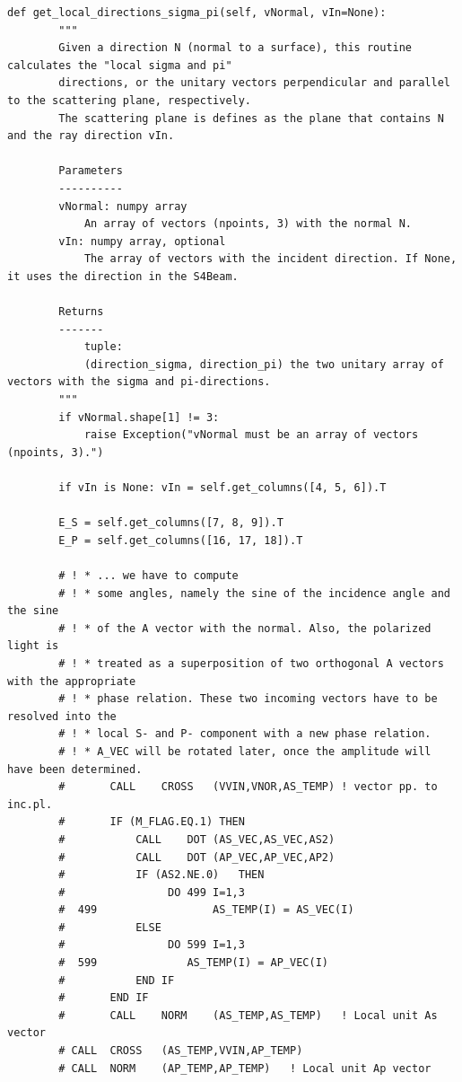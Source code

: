 \documentclass{iucr}
\begin{document}
\begin{lstlisting}[caption={Method of {\tt S4Beam} to compute the local directions $\sigma$ and $\pi$ at the beamline element.}, label={lst:localsigmaandpi}, captionpos=b]
    def get_local_directions_sigma_pi(self, vNormal, vIn=None):
        """
        Given a direction N (normal to a surface), this routine calculates the "local sigma and pi"
        directions, or the unitary vectors perpendicular and parallel to the scattering plane, respectively.
        The scattering plane is defines as the plane that contains N and the ray direction vIn.

        Parameters
        ----------
        vNormal: numpy array
            An array of vectors (npoints, 3) with the normal N.
        vIn: numpy array, optional
            The array of vectors with the incident direction. If None, it uses the direction in the S4Beam.

        Returns
        -------
            tuple:
            (direction_sigma, direction_pi) the two unitary array of vectors with the sigma and pi-directions.
        """
        if vNormal.shape[1] != 3:
            raise Exception("vNormal must be an array of vectors (npoints, 3).")

        if vIn is None: vIn = self.get_columns([4, 5, 6]).T

        E_S = self.get_columns([7, 8, 9]).T
        E_P = self.get_columns([16, 17, 18]).T

        # ! * ... we have to compute
        # ! * some angles, namely the sine of the incidence angle and the sine
        # ! * of the A vector with the normal. Also, the polarized light is
        # ! * treated as a superposition of two orthogonal A vectors with the appropriate
        # ! * phase relation. These two incoming vectors have to be resolved into the
        # ! * local S- and P- component with a new phase relation.
        # ! * A_VEC will be rotated later, once the amplitude will have been determined.
        #      	CALL	CROSS 	(VVIN,VNOR,AS_TEMP)	! vector pp. to inc.pl.
        #      	IF (M_FLAG.EQ.1) THEN
        # 	        CALL	DOT	(AS_VEC,AS_VEC,AS2)
        # 	        CALL	DOT	(AP_VEC,AP_VEC,AP2)
        # 	        IF (AS2.NE.0)	THEN
        #              	 DO 499 I=1,3
        #  499   	            AS_TEMP(I) = AS_VEC(I)
        # 	        ELSE
        # 	             DO 599 I=1,3
        #  599	            AS_TEMP(I) = AP_VEC(I)
        # 	        END IF
        #      	END IF
        #      	CALL	NORM  	(AS_TEMP,AS_TEMP)	! Local unit As vector
        # CALL	CROSS	(AS_TEMP,VVIN,AP_TEMP)
        # CALL	NORM	(AP_TEMP,AP_TEMP)	! Local unit Ap vector


\end{lstlisting}
\end{document}
